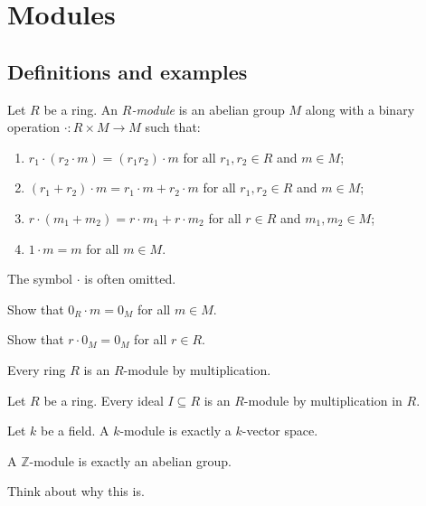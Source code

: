 \documentclass[a4paper,11pt]{article}
\begin{document}
    \section{Modules}
    \subsection{Definitions and examples}
    \begin{definition}
      Let \(R\) be a ring. An \emph{\(R\)-module} is an abelian group \(M\) along with a binary operation \(\cdot: R \times M \to M\) such that:
      \begin{enumerate}[label=(\roman*)]
        \item \(r_1 \cdot (r_2 \cdot m) = (r_1r_2) \cdot m\) for all \(r_1,r_2 \in R\) and \(m \in M\);
        \item \((r_1 + r_2) \cdot m = r_1 \cdot m + r_2 \cdot m\) for all \(r_1,r_2 \in R\) and \(m \in M\);
        \item \(r \cdot (m_1 + m_2) = r \cdot m_1 + r \cdot m_2\) for all \(r \in R\) and \(m_1,m_2 \in M\);
        \item \(1 \cdot m = m\) for all \(m \in M\).
      \end{enumerate}
    \end{definition}
    The symbol \(\cdot\) is often omitted.

    \begin{exercise}
      Show that \(0_R \cdot m = 0_M\) for all \(m \in M\).
    \end{exercise}

    \begin{exercise}
      Show that \(r \cdot 0_M = 0_M\) for all \(r \in R\).
    \end{exercise}

    \begin{example}
      Every ring \(R\) is an \(R\)-module by multiplication.
    \end{example}

    \begin{example}
      Let \(R\) be a ring. Every ideal \(I \subseteq R\) is an \(R\)-module by multiplication in \(R\).
    \end{example}

    \begin{example}
      Let \(k\) be a field. A \(k\)-module is exactly a \(k\)-vector space.
    \end{example}

    \begin{example}
      A \(\mathbb{Z}\)-module is exactly an abelian group.
    \end{example}
    Think about why this is.
\end{document}
